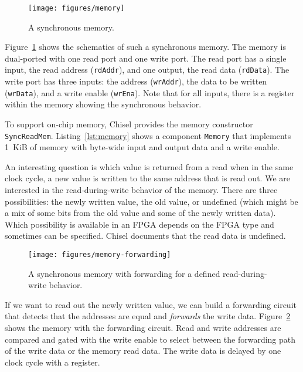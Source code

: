 \documentclass[%
    10pt,
    headinclude, footexclude,
    openright, %
    notitlepage,
    cleardoubleempty,
    headsepline,
    pointlessnumbers,
    bibtotoc, idxtotoc,
    ]{scrbook}
\newcommand{\scale}{0.7}
\newcommand{\code}[1]{{\lstinline[basicstyle=\small\ttfamily]{#1}}}
\begin{document}
\begin{figure}
  \centering
  \texttt{[image: figures/memory]}
  \caption{A synchronous memory.}
  \label{fig:memory}
\end{figure}

Figure~\ref{fig:memory} shows the schematics of such a synchronous memory.
The memory is dual-ported with one read port and one write port.
The read port has a single input, the read address (\code{rdAddr}), and
one output, the read data (\code{rdData}).
The write port has three inputs: the address (\code{wrAddr}), the data
to be written (\code{wrData}), and a write enable (\code{wrEna}).
Note that for all inputs, there is a register within the memory showing the
synchronous behavior.

To support on-chip memory, Chisel provides the memory constructor \code{SyncReadMem}.
Listing~\ref{lst:memory} shows a component \code{Memory} that implements
1~KiB of memory with byte-wide input and output data and a write enable.


An interesting question is which value is returned from a read when in the same clock
cycle, a new value is written to the same address that is read out.
We are interested in the read-during-write behavior of the memory.
There are three possibilities: the newly written value, the old value, or undefined
(which might be a mix of some bits from the old value and some of the newly written data).
Which possibility is available in an FPGA depends on the FPGA type and
sometimes can be specified.
Chisel documents that the read data is undefined.

\begin{figure}
  \centering
  \texttt{[image: figures/memory-forwarding]}
  \caption{A synchronous memory with forwarding for a defined read-during-write behavior.}
  \label{fig:memory:forwarding}
\end{figure}

If we want to read out the newly written value, we can build a forwarding
circuit that detects that the addresses are equal and \emph{forwards} the
write data. Figure~\ref{fig:memory:forwarding} shows the memory with
the forwarding circuit. Read and write addresses are compared and gated with
the write enable to select between the forwarding path of the write data or the
memory read data. The write data is delayed by one clock cycle with a register.
\end{document}
